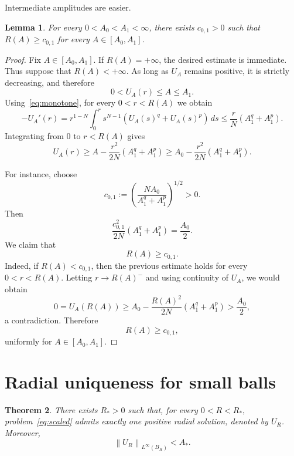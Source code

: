 \documentclass[11pt]{article}
\newcommand{\norm}[1]{\left\|#1\right\|}
\newcommand{\oldrev}[1]{#1}
\newtheorem{theorem}{Theorem}[section]
\newtheorem{lemma}[theorem]{Lemma}
\theoremstyle{definition}
\begin{document}
Intermediate amplitudes are easier.

\begin{lemma}
\label{lem:intermediate}
For every $0<A_0<A_1<\infty$, there exists $c_{0,1}>0$ such that
\(
R(A)\geq c_{0,1}
\)
for every \(A\in[A_0,A_1]\).
\end{lemma}

\begin{proof}
Fix $A\in[A_0,A_1]$.
\oldrev{If $R(A)=+\infty$, the desired estimate is immediate.
Thus suppose that $R(A)<+\infty$.}
As long as $U_A$ remains positive, it is
strictly decreasing, and therefore
\[
0<U_A(r)\leq A\leq A_1.
\]
Using~\eqref{eq:monotone}, for every $0<r<R(A)$ we obtain
\[
-U_A'(r)
=
r^{1-N}
\int_0^r
s^{N-1}
\left(
U_A(s)^q+U_A(s)^p
\right)\,ds
\leq
\frac{r}{N}
\left(A_1^q+A_1^p\right).
\]
Integrating from $0$ to $r<R(A)$ gives
\[
U_A(r)
\geq
A
-
\frac{r^2}{2N}
\left(A_1^q+A_1^p\right)
\geq
A_0
-
\frac{r^2}{2N}
\left(A_1^q+A_1^p\right).
\]

\oldrev{For instance, choose}
\[
\oldrev{
c_{0,1}
:=
\left(
\frac{N A_0}{A_1^q+A_1^p}
\right)^{1/2}>0.
}
\]
\oldrev{Then}
\[
\frac{c_{0,1}^2}{2N}
\left(A_1^q+A_1^p\right)
=
\frac{A_0}{2}.
\]
We claim that
\[
R(A)\geq c_{0,1}.
\]
Indeed, if $R(A)<c_{0,1}$, then the previous estimate holds for every
$0<r<R(A)$. Letting $r\to R(A)^-$ and using continuity of $U_A$, we
would obtain
\[
0=U_A(R(A))
\geq
A_0
-
\frac{R(A)^2}{2N}
\left(A_1^q+A_1^p\right)
>
\frac{A_0}{2},
\]
a contradiction. Therefore
\[
R(A)\geq c_{0,1},
\]
uniformly for $A\in[A_0,A_1]$.
\end{proof}

  
\section{Radial uniqueness for small balls}

\begin{theorem}
\label{thm:radial}
There exists $R_*>0$ such that, for every
\(
0<R<R_*,
\)
problem~\eqref{eq:scaled} admits exactly one positive radial solution,
denoted by $U_R$. Moreover,
\[
\norm{U_R}_{L^\infty(B_R)}<A_*.
\]
\end{theorem}
\end{document}
